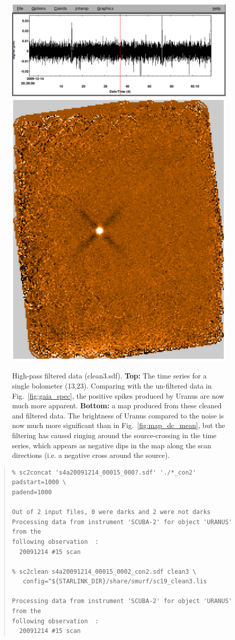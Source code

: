 \documentclass[twoside,11pt]{article}
\renewcommand{\_}{\texttt{\symbol{95}}}
\newenvironment{myquote}{\begin{quote}\begin{small}}{\end{small}\end{quote}}
\begin{document}
\begin{figure}
\begin{center}
\includegraphics[width=\linewidth]{sc19_spec_filt} \\
\vspace{0.3in}
\includegraphics[width=0.5\linewidth]{sc19_map_highpass}
\caption{High-pass filtered data (clean3.sdf). \textbf{Top:} The time
  series for a single bolometer (13,23). Comparing with the un-filtered
  data in Fig.~\ref{fig:gaia_spec}, the positive spikes produced by
  Uranus are now much more apparent. \textbf{Bottom:} a map produced from
  these cleaned and filtered data. The brightness of Uranus compared
  to the noise is now much more significant than in
  Fig.~\ref{fig:map_dc_mean}, but the filtering has caused ringing
  around the source-crossing in the time series, which appears as
  negative dips in the map along the scan directions (i.e. a negative
  cross around the source).}
\label{fig:highpass}
\end{center}
\end{figure}

\begin{myquote}
\begin{verbatim}
% sc2concat 's4a20091214_00015_000?.sdf' './*_con2' padstart=1000 \
padend=1000

Out of 2 input files, 0 were darks and 2 were not darks
Processing data from instrument 'SCUBA-2' for object 'URANUS' from the
following observation  :
  20091214 #15 scan

% sc2clean s4a20091214_00015_0002_con2.sdf clean3 \
   config=^${STARLINK_DIR}/share/smurf/sc19_clean3.lis

Processing data from instrument 'SCUBA-2' for object 'URANUS' from the
following observation  :
  20091214 #15 scan

\end{verbatim}
\end{myquote}
\end{document}
